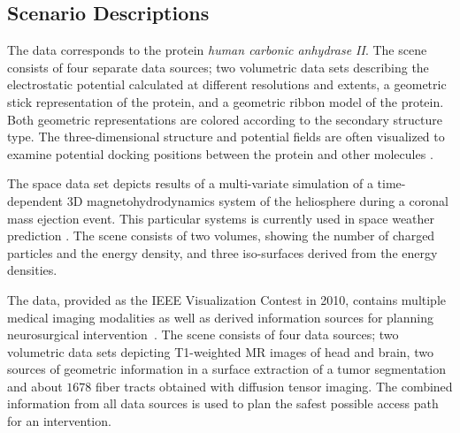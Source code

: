 \documentclass{egpubl}
\begin{document}
\subsection{Scenario Descriptions}
\label{sec:scenarios}

\begin{description}[font=\normalfont\itshape]
\item[Figure~\ref{fig:protein}, protein:]%
  The data corresponds to the protein \emph{human carbonic anhydrase II}.
  The scene consists of four separate data sources; two volumetric data sets describing the electrostatic potential calculated at different resolutions and extents, a geometric stick representation of the protein, and a geometric ribbon model of the protein.
  Both geometric representations are colored according to the secondary structure type.
  The three-dimensional structure and potential fields are often visualized to examine potential docking positions between the protein and other molecules \cite{Seeliger2010}.

\item[Figure~\ref{fig:space}, space:]%
  The space data set depicts results of a multi-variate simulation of a time-dependent 3D magnetohydrodynamics system of the heliosphere during a coronal mass ejection event.
  This particular systems is currently used in space weather prediction \cite{Xie2004}.
  The scene consists of two volumes, showing the number of charged particles and the energy density, and three iso-surfaces derived from the energy densities.

\item[Figure~\ref{fig:neuro}, medical:]%
  The data, provided as the IEEE Visualization Contest in 2010, contains multiple medical imaging modalities as well as derived information sources for planning neurosurgical intervention~\cite{VisContest2010}.
  The scene consists of four data sources; two volumetric data sets depicting T1-weighted MR images of head and brain, two sources of geometric information in a surface extraction of a tumor segmentation and about $1678$ fiber tracts obtained with diffusion tensor imaging. %
  The combined information from all data sources is used to plan the safest possible access path for an intervention.


\end{description}
\end{document}
